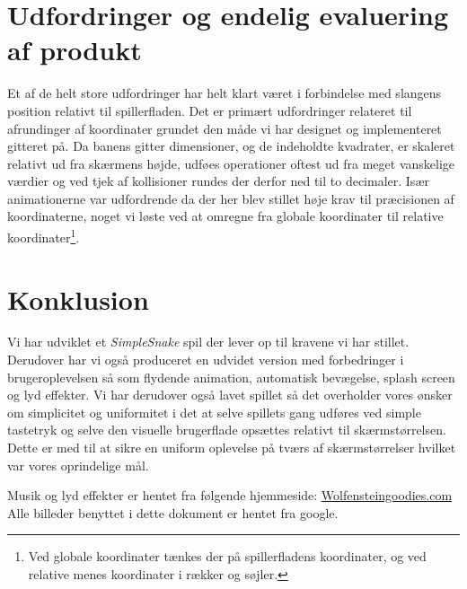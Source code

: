 \documentclass[]{article}
\begin{document}
\section{Udfordringer og endelig evaluering af produkt}

Et af de helt store udfordringer har helt klart været i forbindelse med slangens position relativt til spillerfladen. Det er primært udfordringer relateret til afrundinger af koordinater grundet den måde vi har designet og implementeret gitteret på. Da banens gitter dimensioner, og de indeholdte kvadrater, er skaleret relativt ud fra skærmens højde, udføes operationer oftest ud fra meget vanskelige værdier og ved tjek af kollisioner rundes der derfor ned til to decimaler. Især animationerne var udfordrende da der her blev stillet høje krav til præcisionen af koordinaterne, noget vi løste ved at omregne fra globale koordinater til relative koordinater\footnote{Ved globale koordinater tænkes der på spillerfladens koordinater, og ved relative menes koordinater i rækker og søjler.}.


\section{Konklusion}

Vi har udviklet et \textit{SimpleSnake} spil der lever op til kravene vi har stillet. Derudover har vi også produceret en udvidet version med forbedringer i brugeroplevelsen så som flydende animation, automatisk bevægelse, splash screen og lyd effekter. 
Vi har derudover også lavet spillet så det overholder vores ønsker om simplicitet og uniformitet i det at selve spillets gang udføres ved simple tastetryk og selve den visuelle brugerflade opsættes relativt til skærmstørrelsen. Dette er med til at sikre en uniform oplevelse på tværs af skærmstørrelser hvilket var vores oprindelige mål. 

\begin{thebibliography}{2}
	Musik og lyd effekter er hentet fra følgende hjemmeside: \href{http://www.wolfensteingoodies.com/archives/olddoom/music.htm}{Wolfensteingoodies.com}
	Alle billeder benyttet i dette dokument er hentet fra google.
\end{thebibliography}
\end{document}
